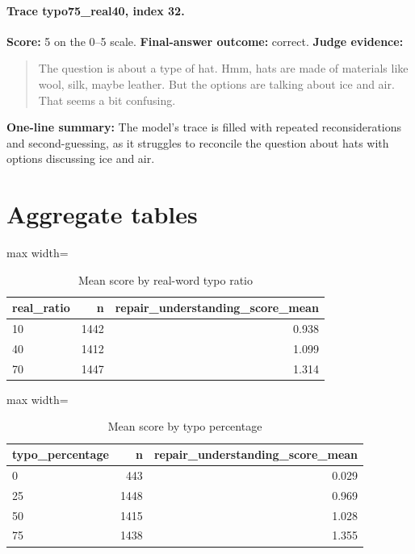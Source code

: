 \documentclass[11pt]{article}
\begin{document}
\paragraph{Trace typo75\_real40, index 32.}
\textbf{Score:} 5 on the 0--5 scale. \textbf{Final-answer outcome:} correct.
\textbf{Judge evidence:} \begin{quote}The question is about a type of hat. Hmm, hats are made of materials like wool, silk, maybe leather. But the options are talking about ice and air. That seems a bit confusing.\end{quote}
\textbf{One-line summary:} The model's trace is filled with repeated reconsiderations and second-guessing, as it struggles to reconcile the question about hats with options discussing ice and air.\medskip

\section*{Aggregate tables}

\begin{table}[H]
\centering
\caption{Mean score by real-word typo ratio}
\small
\begin{adjustbox}{max width=\textwidth}
\begin{tabular}{lrr}
\toprule
\textbf{real\_ratio} & \textbf{n} & \textbf{repair\_understanding\_score\_mean} \\
\midrule
10 & 1442 & 0.938 \\
40 & 1412 & 1.099 \\
70 & 1447 & 1.314 \\
\bottomrule
\end{tabular}
\end{adjustbox}
\end{table}

\begin{table}[H]
\centering
\caption{Mean score by typo percentage}
\small
\begin{adjustbox}{max width=\textwidth}
\begin{tabular}{lrr}
\toprule
\textbf{typo\_percentage} & \textbf{n} & \textbf{repair\_understanding\_score\_mean} \\
\midrule
0 & 443 & 0.029 \\
25 & 1448 & 0.969 \\
50 & 1415 & 1.028 \\
75 & 1438 & 1.355 \\
\bottomrule
\end{tabular}
\end{adjustbox}
\end{table}
\end{document}
